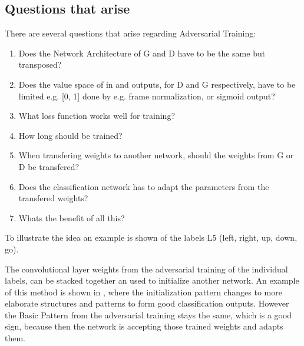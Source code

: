 \subsection{Questions that arise}
There are several questions that arise regarding Adversarial Training:
\begin{enumerate}[label={Q.\textgoth{A}.\arabic*)}, leftmargin=1.4cm]
  \item Does the Network Architecture of G and D have to be the same but transposed?
  \item Does the value space of in and outputs, for D and G respectively, have to be limited e.g. [0, 1] done by e.g. frame normalization, or sigmoid output?
  \item What loss function works well for training?
  \item How long should be trained?
  \item When transfering weights to another network, should the weights from G or D be transfered?
  \item Does the classification network has to adapt the parameters from the transfered weights?
  \item Whats the benefit of all this?
\end{enumerate}

To illustrate the idea an example is shown of the labels L5 (left, right, up, down, go).

The convolutional layer weights from the adversarial training of the individual labels, 
can be stacked together an used to initialize another network.
An example of this method is shown in , where the initialization pattern changes to more elaborate structures and patterns to form good classification outputs. 
However the Basic Pattern from the adversarial training stays the same, which is a good sign, because then the network is accepting those trained weights and adapts them.

